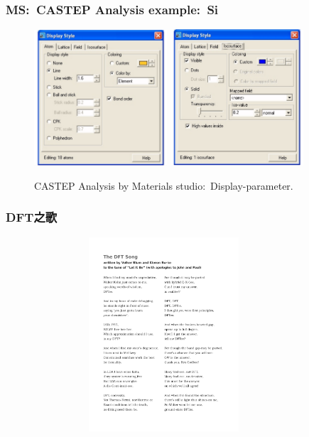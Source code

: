 \frame
{
	\frametitle{\textrm{MS:~CASTEP Analysis example:~Si}}
\begin{figure}[h!]
\centering
\includegraphics[height=2.00in,width=1.95in,viewport=0 0 810 820,clip]{Figures/MS-CASTEP-12-Si-Analysis-display-parameter-1.png}
\includegraphics[height=2.00in,width=1.95in,viewport=0 0 802 822,clip]{Figures/MS-CASTEP-12-Si-Analysis-display-parameter-2.png}
\caption{\tiny \textrm{CASTEP Analysis by Materials studio:~Display-parameter.}}%
\label{MS-CASTEP-Analysis-display-parameter}
\end{figure}
}

\appendix
\frame
{
	\frametitle{\rm{DFT}之歌}
\begin{figure}[h!]
	\vspace{-10pt}
\centering
\includegraphics[height=2.85in,width=3.8in,viewport=0 350 550 720,clip]{Figures/DFT_song-1.pdf}
\label{DFT_Song_01}
\end{figure}
}

